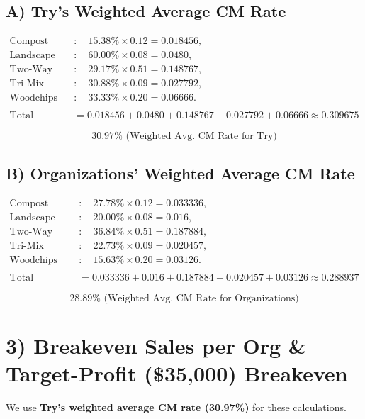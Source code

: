 \documentclass[12pt]{article}
\begin{document}
\subsection*{A) Try’s Weighted Average CM Rate}

\begin{align*}
\text{Compost} &:\quad 15.38\% \times 0.12 = 0.018456,\\
\text{Landscape Mulch} &:\quad 60.00\% \times 0.08 = 0.0480,\\
\text{Two-Way Topsoil} &:\quad 29.17\% \times 0.51 = 0.148767,\\
\text{Tri-Mix Topsoil} &:\quad 30.88\% \times 0.09 = 0.027792,\\
\text{Woodchips} &:\quad 33.33\% \times 0.20 = 0.06666.\\
\\
\text{Total} & = 0.018456 + 0.0480 + 0.148767 + 0.027792 + 0.06666 \approx 0.309675
\end{align*}

\[
\boxed{30.97\% \text{ (Weighted Avg.\ CM Rate for Try)}}
\]

\subsection*{B) Organizations’ Weighted Average CM Rate}

\begin{align*}
\text{Compost} &:\quad 27.78\% \times 0.12 = 0.033336,\\
\text{Landscape Mulch} &:\quad 20.00\% \times 0.08 = 0.016,\\
\text{Two-Way Topsoil} &:\quad 36.84\% \times 0.51 = 0.187884,\\
\text{Tri-Mix Topsoil} &:\quad 22.73\% \times 0.09 = 0.020457,\\
\text{Woodchips} &:\quad 15.63\% \times 0.20 = 0.03126.\\
\\
\text{Total} & = 0.033336 + 0.016 + 0.187884 + 0.020457 + 0.03126 \approx 0.288937
\end{align*}

\[
\boxed{28.89\% \text{ (Weighted Avg.\ CM Rate for Organizations)}}
\]

\section{3) Breakeven Sales per Org \& Target-Profit (\$35,000) Breakeven}

We use \textbf{Try’s weighted average CM rate (30.97\%)} for these calculations.
\end{document}
